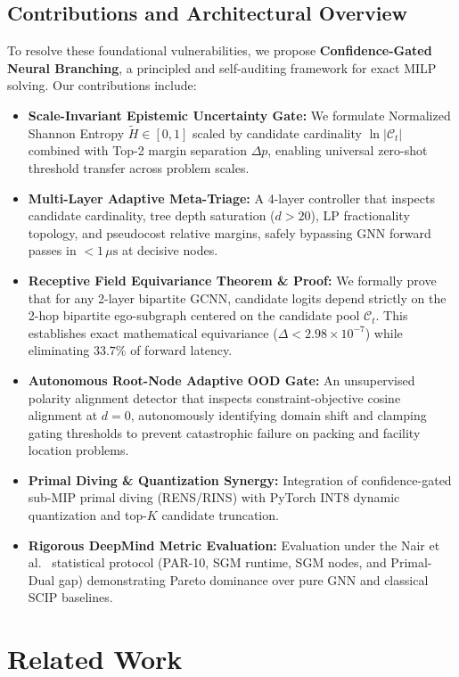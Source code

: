 \documentclass[10pt,twocolumn,letterpaper]{article}
\theoremstyle{plain}
\theoremstyle{definition}
\theoremstyle{remark}
\begin{document}
\subsection{Contributions and Architectural Overview}
To resolve these foundational vulnerabilities, we propose \textbf{Confidence-Gated Neural Branching}, a principled and self-auditing framework for exact MILP solving. Our contributions include:
\begin{itemize}
    \item \textbf{Scale-Invariant Epistemic Uncertainty Gate:} We formulate Normalized Shannon Entropy $\tilde{H} \in [0, 1]$ scaled by candidate cardinality $\ln |\mathcal{C}_t|$ combined with Top-2 margin separation $\Delta p$, enabling universal zero-shot threshold transfer across problem scales.
    \item \textbf{Multi-Layer Adaptive Meta-Triage:} A 4-layer controller that inspects candidate cardinality, tree depth saturation ($d > 20$), LP fractionality topology, and pseudocost relative margins, safely bypassing GNN forward passes in $<1\,\mu\text{s}$ at decisive nodes.
    \item \textbf{Receptive Field Equivariance Theorem \& Proof:} We formally prove that for any 2-layer bipartite GCNN, candidate logits depend strictly on the 2-hop bipartite ego-subgraph centered on the candidate pool $\mathcal{C}_t$. This establishes exact mathematical equivariance ($\Delta < 2.98 \times 10^{-7}$) while eliminating $33.7\%$ of forward latency.
    \item \textbf{Autonomous Root-Node Adaptive OOD Gate:} An unsupervised polarity alignment detector that inspects constraint-objective cosine alignment at $d=0$, autonomously identifying domain shift and clamping gating thresholds to prevent catastrophic failure on packing and facility location problems.
    \item \textbf{Primal Diving \& Quantization Synergy:} Integration of confidence-gated sub-MIP primal diving (RENS/RINS) with PyTorch INT8 dynamic quantization and top-$K$ candidate truncation.
    \item \textbf{Rigorous DeepMind Metric Evaluation:} Evaluation under the Nair et al.~\cite{nair2020solving} statistical protocol (PAR-10, SGM runtime, SGM nodes, and Primal-Dual gap) demonstrating Pareto dominance over pure GNN and classical SCIP baselines.
\end{itemize}

\section{Related Work}
\label{sec:related}
\end{document}
